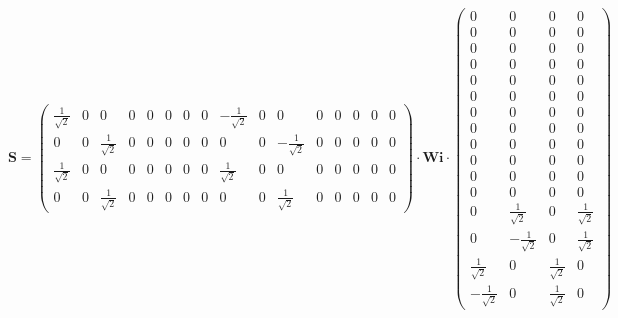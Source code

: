 \[ \mathbf{S} = \left(\begin{smallmatrix} \frac{1}{\sqrt{2}} & 0 & 0 &
0 & 0 & 0 & 0 & 0 & -\frac{1}{\sqrt{2}} & 0 & 0 & 0 & 0 & 0 & 0 & 0 \\
0 & 0 & \frac{1}{\sqrt{2}} & 0 & 0 & 0 & 0 & 0 & 0 & 0 &
-\frac{1}{\sqrt{2}} & 0 & 0 & 0 & 0 & 0 \\ \frac{1}{\sqrt{2}} & 0 & 0
& 0 & 0 & 0 & 0 & 0 & \frac{1}{\sqrt{2}} & 0 & 0 & 0 & 0 & 0 & 0 & 0
\\ 0 & 0 & \frac{1}{\sqrt{2}} & 0 & 0 & 0 & 0 & 0 & 0 & 0 &
\frac{1}{\sqrt{2}} & 0 & 0 & 0 & 0 & 0 \end{smallmatrix}\right) \cdot
\mathbf{Wi} \cdot\left(\begin{smallmatrix} 0 & 0 & 0 & 0 \\ 0 & 0 & 0
& 0 \\ 0 & 0 & 0 & 0 \\ 0 & 0 & 0 & 0 \\ 0 & 0 & 0 & 0 \\ 0 & 0 & 0 &
0 \\ 0 & 0 & 0 & 0 \\ 0 & 0 & 0 & 0 \\ 0 & 0 & 0 & 0 \\ 0 & 0 & 0 & 0
\\ 0 & 0 & 0 & 0 \\ 0 & 0 & 0 & 0 \\ 0 & \frac{1}{\sqrt{2}} & 0 &
\frac{1}{\sqrt{2}} \\ 0 & -\frac{1}{\sqrt{2}} & 0 & \frac{1}{\sqrt{2}}
\\ \frac{1}{\sqrt{2}} & 0 & \frac{1}{\sqrt{2}} & 0 \\
-\frac{1}{\sqrt{2}} & 0 & \frac{1}{\sqrt{2}} & 0
\end{smallmatrix}\right) \]
